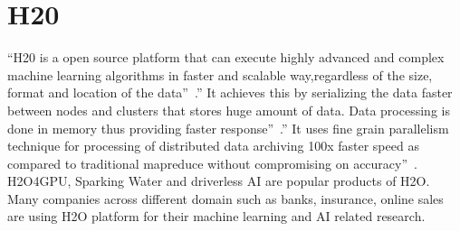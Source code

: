 \section{H20}


``H20 is a open source platform that can execute highly advanced 
and complex machine learning algorithms in faster and scalable 
way,regardless of the size, format and location of the 
data''~\cite{hid-sp18-523-www-h2o}.'' It achieves this by serializing 
the data faster between nodes and clusters that stores huge amount 
of data. Data processing is done in memory thus providing faster 
response''~\cite{hid-sp18-523-www-h2o}.'' It uses fine grain parallelism 
technique for processing of distributed data archiving 100x faster 
speed as compared to traditional mapreduce without compromising 
on accuracy''~\cite{hid-sp18-523-www-h2o}. H2O4GPU, Sparking Water
and driverless AI are popular products of H2O. Many companies
across different domain such as banks, insurance, online sales 
are using H2O platform for their machine learning and AI related
research.





